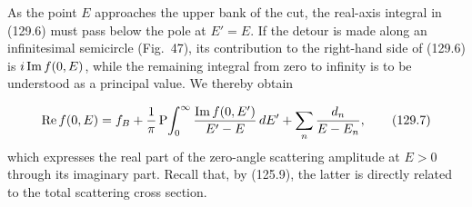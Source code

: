As the point $E$ approaches the upper bank of the cut, the real-axis integral
in (129.6) must pass below the pole at $E'=E$. If the detour is made along an
infinitesimal semicircle (Fig.~47), its contribution to the right-hand side of
(129.6) is $i\mathop{\rm Im}f(0,E)$, while the remaining integral from zero to
infinity is to be understood as a principal value. We thereby obtain

\begin{figure}[htbp]
\centering
{}
\caption{}
\label{fig:47}
\end{figure}

\begin{equation}
 \mathop{\rm Re}f(0,E)=f_B+\frac1\pi\,\mathrm{P}\!\int_0^\infty
 \frac{\mathop{\rm Im}f(0,E')}{E'-E}\,dE'+\sum_n\frac{d_n}{E-E_n},
 \tag{129.7}
\end{equation}
which expresses the real part of the zero-angle scattering amplitude at
$E>0$ through its imaginary part. Recall that, by (125.9), the latter is
directly related to the total scattering cross section.
